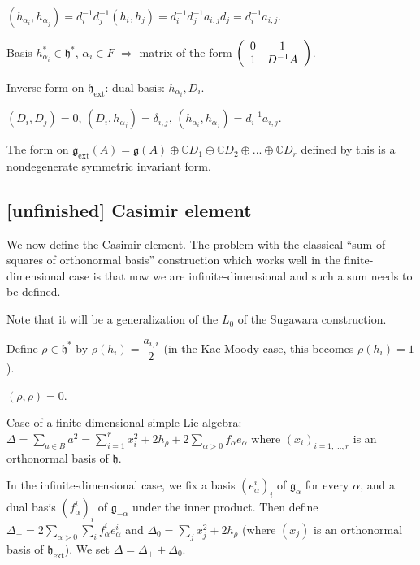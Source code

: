 \documentclass[etingof-lie.tex]{subfiles}
\begin{document}
$\left(  h_{\alpha_{i}},h_{\alpha_{j}}\right)  =d_{i}^{-1}d_{j}^{-1}\left(
h_{i},h_{j}\right)  =d_{i}^{-1}d_{j}^{-1}a_{i,j}d_{j}=d_{i}^{-1}a_{i,j}$.

Basis $h_{\alpha_{i}}^{\ast}\in\mathfrak{h}^{\ast}$, $\alpha_{i}\in F$
$\Longrightarrow$ matrix of the form $\left(
\begin{array}
[c]{cc}%
0 & 1\\
1 & D^{-1}A
\end{array}
\right)  $.

Inverse form on $\mathfrak{h}_{\operatorname*{ext}}$: dual basis:
$h_{\alpha_{i}},D_{i}$.

$\left(  D_{i},D_{j}\right)  =0$, $\left(  D_{i},h_{\alpha_{j}}\right)
=\delta_{i,j}$, $\left(  h_{\alpha_{i}},h_{\alpha_{j}}\right)  =d_{i}%
^{-1}a_{i,j}$.

\begin{proposition}
The form on $\mathfrak{g}_{\operatorname*{ext}}\left(  A\right)
=\mathfrak{g}\left(  A\right)  \oplus\mathbb{C}D_{1}\oplus\mathbb{C}%
D_{2}\oplus...\oplus\mathbb{C}D_{r}$ defined by this is a nondegenerate
symmetric invariant form.
\end{proposition}

\subsection{\textbf{[unfinished]} Casimir element}

We now define the Casimir element. The problem with the classical ``sum of
squares of orthonormal basis'' construction which works well in the
finite-dimensional case is that now we are infinite-dimensional and such a sum
needs to be defined.

Note that it will be a generalization of the $L_{0}$ of the Sugawara construction.

Define $\rho\in\mathfrak{h}^{\ast}$ by $\rho\left(  h_{i}\right)
=\dfrac{a_{i,i}}{2}$ (in the Kac-Moody case, this becomes $\rho\left(
h_{i}\right)  =1$).

$\left(  \rho,\rho\right)  =0$.

Case of a finite-dimensional simple Lie algebra: $\Delta=\sum\limits_{a\in
B}a^{2}=\sum\limits_{i=1}^{r}x_{i}^{2}+2h_{\rho}+2\sum\limits_{\alpha
>0}f_{\alpha}e_{\alpha}$ where $\left(  x_{i}\right)  _{i=1,...,r}$ is an
orthonormal basis of $\mathfrak{h}$.

In the infinite-dimensional case, we fix a basis $\left(  e_{\alpha}%
^{i}\right)  _{i}$ of $\mathfrak{g}_{\alpha}$ for every $\alpha$, and a dual
basis $\left(  f_{\alpha}^{i}\right)  _{i}$ of $\mathfrak{g}_{-\alpha}$ under
the inner product. Then define $\Delta_{+}=2\sum\limits_{\alpha>0}%
\sum\limits_{i}f_{\alpha}^{i}e_{\alpha}^{i}$ and $\Delta_{0}=\sum
\limits_{j}x_{j}^{2}+2h_{\rho}$ (where $\left(  x_{j}\right)  $ is an
orthonormal basis of $\mathfrak{h}_{\operatorname*{ext}}$). We set
$\Delta=\Delta_{+}+\Delta_{0}$.
\end{document}
